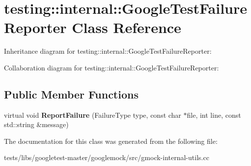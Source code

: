 \hypertarget{classtesting_1_1internal_1_1GoogleTestFailureReporter}{}\section{testing\+:\+:internal\+:\+:Google\+Test\+Failure\+Reporter Class Reference}
\label{classtesting_1_1internal_1_1GoogleTestFailureReporter}


Inheritance diagram for testing\+:\+:internal\+:\+:Google\+Test\+Failure\+Reporter\+:


Collaboration diagram for testing\+:\+:internal\+:\+:Google\+Test\+Failure\+Reporter\+:
\subsection*{Public Member Functions}
\begin{DoxyCompactItemize}
\item 
\mbox{\label{classtesting_1_1internal_1_1GoogleTestFailureReporter_a096dae47177340acac5f3d6528b852ca}} 
virtual void {\bfseries Report\+Failure} (Failure\+Type type, const char $\ast$file, int line, const std\+::string \&message)
\end{DoxyCompactItemize}


The documentation for this class was generated from the following file\+:\begin{DoxyCompactItemize}
\item 
tests/libs/googletest-\/master/googlemock/src/gmock-\/internal-\/utils.\+cc\end{DoxyCompactItemize}
